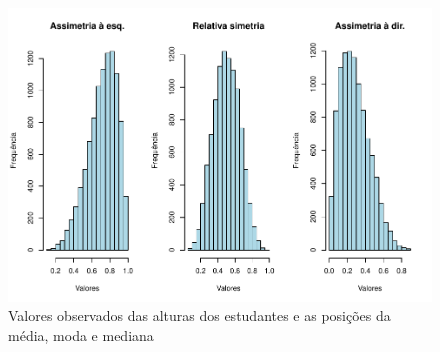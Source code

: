 \documentclass[
]{book}
\begin{document}
\begin{figure}

{\centering \includegraphics{apostila_files/figure-latex/unnamed-chunk-41-1} 

}

\caption{Valores observados das alturas dos estudantes e as posições da média, moda e mediana}\label{fig:unnamed-chunk-41}
\end{figure}
\end{document}
